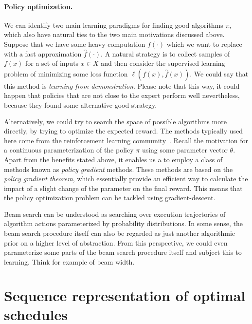 \documentclass[a4paper]{report}
\theoremstyle{definition}
\theoremstyle{plain}
\begin{document}
\paragraph{Policy optimization.}

We can identify two main learning paradigms for finding good algorithms $\pi$,
which also have natural ties to the two main motivations discussed above.
%
Suppose that we have some heavy computation $f(\cdot)$ which we want to replace
with a fast approximation $\hat{f}(\cdot)$.
%
A natural strategy is to collect samples of $f(x)$ for a set of inputs $x \in X$
and then consider the supervised learning problem of minimizing some loss
function $\ell(f(x), \hat{f}(x))$.
%
We could say that this method is \emph{learning from demonstration}.
%
Please note that this way, it could happen that policies that are not close to
the expert perform well nevertheless, because they found some alternative good
strategy.

Alternatively, we could try to search the space of possible algorithms more
directly, by trying to optimize the expected reward.
%
The methods typically used here come from the reinforcement learning
community~\cite{mazyavkinaReinforcementLearningCombinatorial2020}.
%
Recall the motivation for a continuous parameterization of the policy $\pi$
using some parameter vector $\theta$.
%
Apart from the benefits stated above, it enables us a to employ a class of
methods known as \emph{policy gradient} methods.
%
These methods are based on the \emph{policy gradient theorem}, which essentially
provide an efficient way to calculate the impact of a slight change of the
parameter on the final reward.
%
This means that the policy optimization problem can be tackled using
gradient-descent.

Beam search can be understood as searching over execution trajectories of
algorithm actions parameterized by probability distributions.
%
In some sense, the beam search procedure itself can also be regarded as just
another algorithmic prior on a higher level of abstraction.
%
From this perspective, we could even parameterize some parts of the beam search
procedure itself and subject this to learning. Think for example of beam width.

\clearpage
\section{Sequence representation of optimal schedules}\label{sec:sequence-representation}
\end{document}
